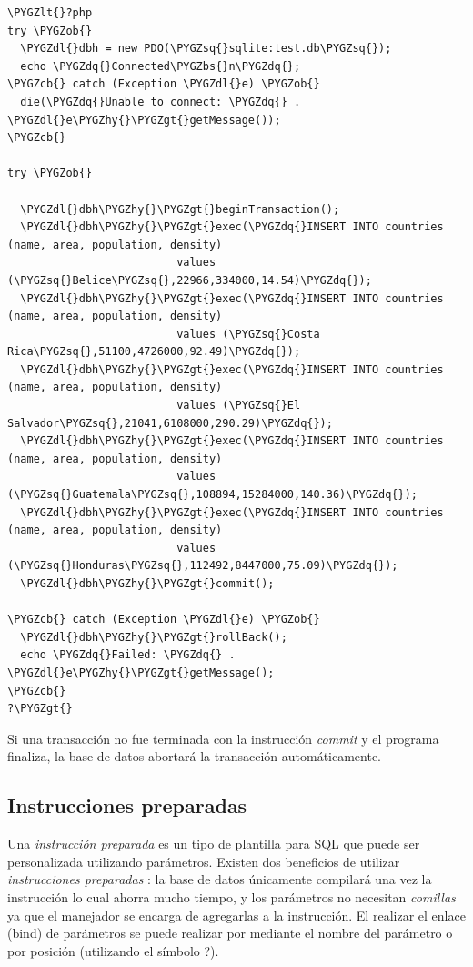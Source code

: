 \documentclass[a5paper,10pt,spanish]{sphinxmanual}
\def\PYGZbs{\char`\\}
\def\PYGZob{\char`\{}
\def\PYGZcb{\char`\}}
\def\PYGZlt{\char`\<}
\def\PYGZgt{\char`\>}
\def\PYGZdl{\char`\$}
\def\PYGZhy{\char`\-}
\def\PYGZsq{\char`\'}
\def\PYGZdq{\char`\"}
\begin{document}
\begin{Verbatim}[commandchars=\\\{\}]
\PYGZlt{}?php
try \PYGZob{}
  \PYGZdl{}dbh = new PDO(\PYGZsq{}sqlite:test.db\PYGZsq{});
  echo \PYGZdq{}Connected\PYGZbs{}n\PYGZdq{};
\PYGZcb{} catch (Exception \PYGZdl{}e) \PYGZob{}
  die(\PYGZdq{}Unable to connect: \PYGZdq{} . \PYGZdl{}e\PYGZhy{}\PYGZgt{}getMessage());
\PYGZcb{}

try \PYGZob{}

  \PYGZdl{}dbh\PYGZhy{}\PYGZgt{}beginTransaction();
  \PYGZdl{}dbh\PYGZhy{}\PYGZgt{}exec(\PYGZdq{}INSERT INTO countries (name, area, population, density)
                          values (\PYGZsq{}Belice\PYGZsq{},22966,334000,14.54)\PYGZdq{});
  \PYGZdl{}dbh\PYGZhy{}\PYGZgt{}exec(\PYGZdq{}INSERT INTO countries (name, area, population, density)
                          values (\PYGZsq{}Costa Rica\PYGZsq{},51100,4726000,92.49)\PYGZdq{});
  \PYGZdl{}dbh\PYGZhy{}\PYGZgt{}exec(\PYGZdq{}INSERT INTO countries (name, area, population, density)
                          values (\PYGZsq{}El Salvador\PYGZsq{},21041,6108000,290.29)\PYGZdq{});
  \PYGZdl{}dbh\PYGZhy{}\PYGZgt{}exec(\PYGZdq{}INSERT INTO countries (name, area, population, density)
                          values (\PYGZsq{}Guatemala\PYGZsq{},108894,15284000,140.36)\PYGZdq{});
  \PYGZdl{}dbh\PYGZhy{}\PYGZgt{}exec(\PYGZdq{}INSERT INTO countries (name, area, population, density)
                          values (\PYGZsq{}Honduras\PYGZsq{},112492,8447000,75.09)\PYGZdq{});
  \PYGZdl{}dbh\PYGZhy{}\PYGZgt{}commit();

\PYGZcb{} catch (Exception \PYGZdl{}e) \PYGZob{}
  \PYGZdl{}dbh\PYGZhy{}\PYGZgt{}rollBack();
  echo \PYGZdq{}Failed: \PYGZdq{} . \PYGZdl{}e\PYGZhy{}\PYGZgt{}getMessage();
\PYGZcb{}
?\PYGZgt{}
\end{Verbatim}

Si una transacción no fue terminada con la instrucción \emph{commit} y el
programa finaliza, la base de datos abortará la transacción
automáticamente.


\subsection{Instrucciones preparadas}
\label{Tutorial5_BasesDatos.md:instrucciones-preparadas}
Una \emph{instrucción preparada} es un tipo de plantilla para SQL que puede
ser personalizada utilizando parámetros. Existen dos beneficios de
utilizar \emph{instrucciones preparadas} : la base de datos únicamente
compilará una vez la instrucción lo cual ahorra mucho tiempo, y los
parámetros no necesitan \emph{comillas} ya que el manejador se encarga de
agregarlas a la instrucción. El realizar el enlace (bind) de parámetros
se puede realizar por mediante el nombre del parámetro o por posición
(utilizando el símbolo ?).
\end{document}
